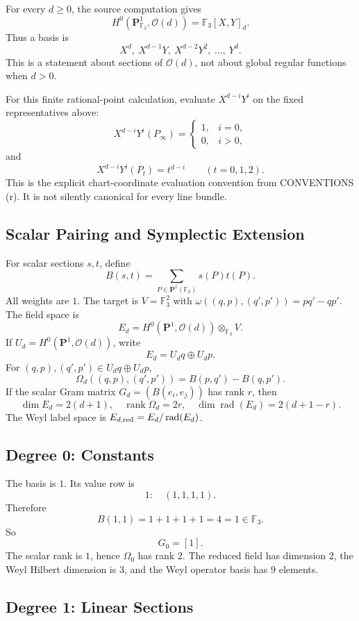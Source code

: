For every \(d\geq0\), the source computation gives
\[
  H^0(\mathbf P^1_{\mathbb F_3},\mathcal O(d))
  =
  \mathbb F_3[X,Y]_d.
\]
Thus a basis is
\[
  X^d,\ X^{d-1}Y,\ X^{d-2}Y^2,\ \ldots,\ Y^d.
\]
This is a statement about sections of \(\mathcal O(d)\), not about global
regular functions when \(d>0\).

For this finite rational-point calculation, evaluate \(X^{d-i}Y^i\) on the
fixed representatives above:
\[
  X^{d-i}Y^i(P_\infty)=
  \begin{cases}
  1,&i=0,\\
  0,&i>0,
  \end{cases}
\]
and
\[
  X^{d-i}Y^i(P_t)=t^{d-i}\qquad(t=0,1,2).
\]
This is the explicit chart-coordinate evaluation convention from
CONVENTIONS (r).  It is not silently canonical for every line bundle.

\subsection{Scalar Pairing and Symplectic Extension}

For scalar sections \(s,t\), define
\[
  B(s,t)=\sum_{P\in\mathbf P^1(\mathbb F_3)}s(P)t(P).
\]
All weights are \(1\).  The target is \(V=\mathbb F_3^2\) with
\(\omega((q,p),(q',p'))=pq'-qp'\).
The field space is
\[
  E_d=H^0(\mathbf P^1,\mathcal O(d))\otimes_{\mathbb F_3}V.
\]
If \(U_d=H^0(\mathbf P^1,\mathcal O(d))\), write
\[
  E_d=U_d q\oplus U_d p.
\]
For \((q,p),(q',p')\in U_d q\oplus U_d p\),
\[
  \Omega_d((q,p),(q',p'))=B(p,q')-B(q,p').
\]
If the scalar Gram matrix \(G_d=(B(e_i,e_j))\) has rank \(r\), then
\[
  \dim E_d=2(d+1),\quad
  \operatorname{rank}\Omega_d=2r,\quad
  \dim\operatorname{rad}(E_d)=2(d+1-r).
\]
The Weyl label space is \(E_{d,\rm red}=E_d/\operatorname{rad}(E_d)\).

\subsection{Degree 0: Constants}

The basis is \(1\).  Its value row is
\[
  1:\quad (1,1,1,1).
\]
Therefore
\[
  B(1,1)=1+1+1+1=4=1\in\mathbb F_3.
\]
So
\[
  G_0=[1].
\]
The scalar rank is \(1\), hence \(\Omega_0\) has rank \(2\).  The reduced
field has dimension \(2\), the Weyl Hilbert dimension is \(3\), and the Weyl
operator basis has \(9\) elements.

\subsection{Degree 1: Linear Sections}

